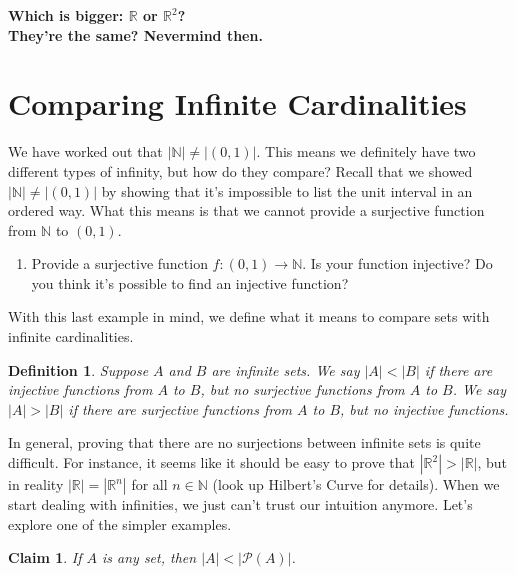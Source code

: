 \documentclass[12 pt]{article}
\newcommand{\R}{\mathbb{R}}
\newcommand{\N}{\mathbb{N}}
\renewcommand{\P}{\mathscr{P}}
\theoremstyle{definition}
\theoremstyle{plain}
\theoremstyle{mytheorem}
\theoremstyle{myexample}
\newtheorem{claim}{Claim}
\theoremstyle{mydefinition}
\newtheorem{definition}{Definition}
\begin{document}
\begin{center}
\textbf{Which is bigger: $\R$ or $\R^2$?\\
They're the same?  Nevermind then.  }
\end{center}



\section{Comparing Infinite Cardinalities}

We have worked out that $|\N| \neq |(0,1)|$.  This means we definitely have two different types of infinity, but how do they compare?  Recall that we showed $|\N| \neq |(0,1)|$ by showing that it's impossible to list the unit interval in an ordered way.  What this means is that we cannot provide a surjective function from $\N$ to $(0,1)$.  

	\begin{enumerate}[resume]
	\item Provide a surjective function $f:(0,1) \to \N$.  Is your function injective?  Do you think it's possible to find an injective function?
	
	\vspace{1.5in}
	\end{enumerate}
	
With this last example in mind, we define what it means to compare sets with infinite cardinalities.

\begin{definition}  Suppose $A$ and $B$ are infinite sets.  We say $|A|<|B|$ if there are injective functions from $A$ to $B$, but no surjective functions from $A$ to $B$.  We say $|A|>|B|$ if there are surjective functions from $A$ to $B$, but no injective functions.
\end{definition}

In general, proving that there are no surjections between infinite sets is quite difficult.  For instance,  it seems like it should be easy to prove that $|\R^2|>|\R|$, but in reality $|\R|=|\R^n|$ for all $n \in \N$ (look up Hilbert's Curve for details).  When we start dealing with infinities, we just can't trust our intuition anymore.  Let's explore one of the simpler examples.

\begin{claim}  If $A$ is any set, then $|A|< |\P(A)|$.
\end{claim}
\end{document}
